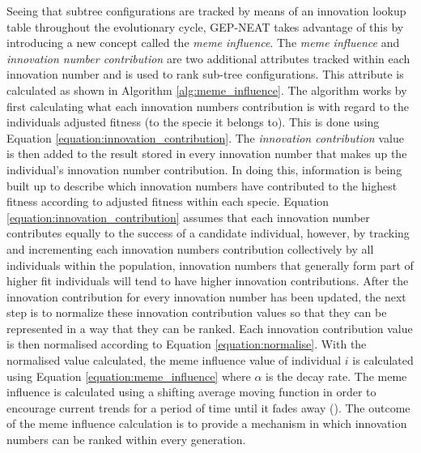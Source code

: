\noindent Seeing that subtree configurations are tracked by means of  an innovation lookup table throughout the evolutionary cycle, GEP-NEAT takes advantage of this by introducing a new concept called the \textit{meme influence}. The \textit{meme influence} and \textit{innovation number contribution} are two additional attributes tracked within each innovation number and is used to rank sub-tree configurations. This attribute is calculated as shown in Algorithm \ref{alg:meme_influence}. The algorithm works by first calculating what each innovation numbers contribution is with regard to the individuals adjusted fitness (to the specie it belongs to). This is done using Equation \ref{equation:innovation_contribution}. The \textit{innovation contribution} value is then added to the result stored in every innovation number that makes up the individual's innovation number contribution. In doing this, information is being built up to describe which innovation numbers have contributed to the highest fitness according to adjusted fitness within each specie. Equation \ref{equation:innovation_contribution} assumes that each innovation number contributes equally to the success of a candidate individual, however, by tracking and incrementing each innovation numbers contribution collectively by all individuals within the population, innovation numbers that generally form part of higher fit individuals will tend to have higher innovation contributions. After the innovation contribution for every innovation number has been updated, the next step is to normalize these innovation contribution values so that they can be represented in a way that they can be ranked. Each innovation contribution value is then normalised according to Equation \ref{equation:normalise}. With the normalised value calculated, the meme influence value of individual $i$ is calculated using Equation \ref{equation:meme_influence} where $\alpha$ is the decay rate. The meme influence is calculated using a shifting average moving function in order to encourage current trends for a period of time until it fades away (\cite{haynes2012exponential}). The outcome of the meme influence calculation is to provide a mechanism in which innovation numbers can be ranked within every generation.

